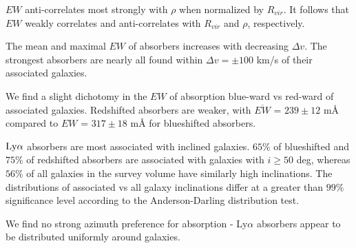 \documentclass[iop]{emulateapj-rtx4}
\begin{document}
\indent \textbullet \indent $EW$ anti-correlates most strongly with $\rho$ when normalized by $R_{vir}$. It follows that $EW$ weakly correlates and anti-correlates with $R_{vir}$ and $\rho$, respectively.

\indent \textbullet \indent The mean and maximal $EW$ of absorbers increases with decreasing $\Delta v$. The strongest absorbers are nearly all found within $\Delta v = \pm 100$ km/s of their associated galaxies.

\indent \textbullet \indent We find a slight dichotomy in the $EW$ of absorption blue-ward vs red-ward of associated galaxies. Redshifted absorbers are weaker, with $\overline{EW}$ = $239 \pm 12$ $\textrm{m\AA}$ compared to $EW$ = $317 \pm 18$ $\textrm{m\AA}$ for blueshifted absorbers.


\textbullet \indent $\rm Ly\alpha$ absorbers are most associated with inclined galaxies. $65\%$ of blueshifted and $75\%$ of redshifted absorbers are associated with galaxies with $i \geq 50$ deg, whereas $56\%$ of all galaxies in the survey volume have similarly high inclinations. The distributions of associated vs all galaxy inclinations differ at a greater than $99\%$ significance level according to the Anderson-Darling distribution test.

\indent \textbullet \indent We find no strong azimuth preference for absorption - Ly$\alpha$ absorbers appear to be distributed uniformly around galaxies.

\nocite{*}


\end{document}
